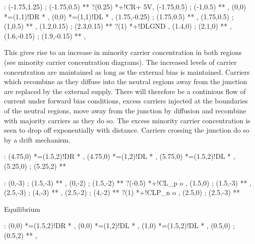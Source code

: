 \documentclass[a4paper,12pt]{article}
\begin{document}
\begin{table}[hbtp]

\xy <1cm,0cm>:
(-1.75,1.25) ; (-1.75,0.5) **\dir{-} ?(0.25) *+!CR{+ 5V},
(-1.75,0.5) ; (-1,0.5) **\dir{-} ,
(0,0) *=(1,1)!DR *\frm{-} ,
(0,0) *=(1,1)!DL *\frm{-} ,
(1.75,-0.25) ; (1.75,0.5) **\dir{-} ,
(1.75,0.5) ; (1,0.5) **\dir{-} ,
(1.2,0.15) ; (2.3,0.15) **\dir{-} ?(1) *+!DL{GND} ,
(1.4,0) ; (2.1,0) **\dir{-} ,
(1.6,-0.15) ; (1.9,-0.15) **\dir{-} ,
\endxy

\end{table}

This gives rise to an increase in minority carrier
concentration in both regions (see minority carrier concentration
diagrams). The increased levels of carrier concentration are maintained
as long as the external bias is maintained. Carriers which recombine as
they diffuse into the neutral regions away from the junction are
replaced by the external supply. 
There will therefore be a continious flow of current under forward bias
conditions, excess carriers injected at the boundaries of the neutral
regions, move away from the junction by diffusion and recombine with 
majority carriers as they do so. The excess minority carrier
concentration is seen to drop off exponentially with distance. Carriers
crossing the junction do so by a drift mechanism.

\begin{table}[hbtp]

\xy <1cm,0cm>:
(4.75,0) *=(1.5,2)!DR *\frm{-} ,
(4.75,0) *=(1,2)!DL\txt{} *\frm{-} ,
(5.75,0) *=(1.5,2)!DL *\frm{-} ,
(5.25,0) ; (5.25,2) **\dir{--}
\endxy

\end{table}

\begin{table}[hbtp]

\xy <1cm,0cm>:
(0,-3) ; (1.5,-3) **\dir{-} ,
(0,-2) ; (1.5,-2) **\dir{-} ?(-0.5) *+!CL{\eta_{p o}} ,
(1.5,0) ; (1.5,-3) **\dir{-} ,
%
(2.5,-3) ; (4,-3) **\dir{-} ,
(2.5,-2) ; (4,-2) **\dir{-} ?(1) *+!CL{P_{n o}} ,
(2.5,0) ; (2.5,-3) **\dir{-}
\endxy

\caption{Equilibrium}

\end{table}

\begin{table}[hbtp]

\xy <1cm,0cm>:
(0,0) *=(1.5,2)!DR *\frm{-} ,
(0,0) *=(1,2)!DL\txt{} *\frm{-} ,
(1,0) *=(1.5,2)!DL *\frm{-} ,
(0.5,0) ; (0.5,2) **\dir{--} ,
\endxy

\end{table}
\end{document}
